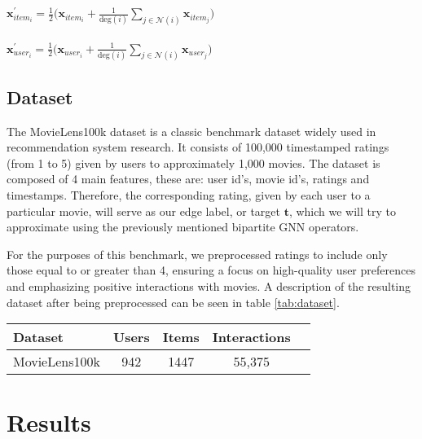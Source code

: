 \documentclass[bst/sn-nature]{sn-jnl}
\begin{document}
\begin{multicols}{2}
\begin{center}
    $\mathbf{x}^{\prime}_{item_{i}} = \frac{1}{2}\big(\mathbf{x}_{item_{i}} +
    \frac{1}{\textrm{deg}(i)}
    \sum_{j \in \mathcal{N}(i)}  \mathbf{x}_{item_{j}} \big)$ \\~\\
    $\mathbf{x}^{\prime}_{user_{i}} = \frac{1}{2}\big(\mathbf{x}_{user_{i}} +
    \frac{1}{\textrm{deg}(i)}
    \sum_{j \in \mathcal{N}(i)} \mathbf{x}_{user_{j}} \big)$
\end{center}

\subsection{Dataset}

\quad The MovieLens100k dataset is a classic benchmark dataset widely used in recommendation system research. It consists of 100,000 timestamped ratings (from 1 to 5) given by users to approximately 1,000 movies. The dataset is composed of 4 main features, these are: user id's, movie id's, ratings and timestamps. Therefore, the corresponding rating, given by each user to a particular movie, will serve as our edge label, or target $\mathbf{t}$, which we will try to approximate using the previously mentioned bipartite GNN operators. 

For the purposes of this benchmark, we preprocessed ratings to include only those equal to or greater than 4, ensuring a focus on high-quality user preferences and emphasizing positive interactions with movies. A description of the resulting dataset after being preprocessed can be seen in table \ref{tab:dataset}. \\ 

\begin{center}
\begin{tabular}{|l|*{4}{c|}}
\hline
                        Dataset & Users    & Items    & Interactions   \\ \hline
MovieLens100k\cite{movielens}               & 942 & 1447 & 55,375 \\ \hline
\end{tabular}
\label{tab:dataset}
\end{center}

\section{Results}


\end{multicols}
\end{document}
